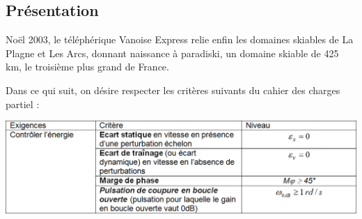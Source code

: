 \documentclass[10pt,fleqn]{article} %
\begin{document}

\vspace{5cm}
\pagestyle{fancy}
\thispagestyle{plain}

\def\columnseprulecolor{\color{ocre}}
\setlength{\columnseprule}{0.4pt} 

\def\pathfig{images}

\begin{multicols}{2}

\subsection*{Présentation}


Noël 2003, le téléphérique Vanoise Express relie enfin les domaines skiables de La Plagne et Les Arcs, donnant naissance à paradiski, un domaine skiable de 425 km, le troisième plus grand de France.

	



Dans ce qui suit, on désire respecter les critères suivants du cahier des charges partiel :
\begin{center}
	\includegraphics[width=\linewidth]{images2/fig_01}
\end{center}


\end{multicols}
\end{document}
